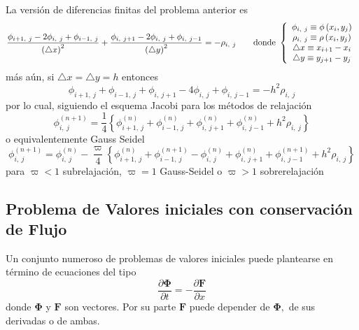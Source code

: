 \documentclass[spanish,titlepage,11pt]{article}
\begin{document}
La versi\'{o}n de diferencias finitas del problema anterior es
\[
\dfrac{\phi_{i+1,\ j}-2\phi_{i,\ j}+\phi_{i-1,\ j}}{\left(  \triangle
x\right)  ^{2}}+\dfrac{\phi_{i,\ j+1}-2\phi_{i,\ j}+\phi_{i,\ j-1}}{\left(
\triangle y\right)  ^{2}}=-\rho_{i,\ j}\qquad\mathrm{donde\ }\left\{
\begin{array}
[c]{c}%
\phi_{i,\ j}\equiv\phi\left(  x_{i},y_{j}\right)  \\
\rho_{i,\ j}\equiv\rho\left(  x_{i},y_{j}\right)  \\
\triangle x\equiv x_{i+1}-x_{i}\\
\triangle y\equiv y_{j+1}-y_{j}%
\end{array}
\right.
\]
m\'{a}s a\'{u}n, si $\triangle x=\triangle y=h$ entonces
\[
\phi_{i+1,\ j}+\phi_{i-1,\ j}+\phi_{i,\ j+1}-4\phi_{i,\ j}+\phi_{i,\ j-1}%
=-h^{2}\rho_{i,\ j}%
\]
por lo cual, siguiendo el esquema Jacobi para los m\'{e}todos de
relajaci\'{o}n
\[
\phi_{i,\ j}^{(n+1)}=\dfrac{1}{4}\left\{  \phi_{i+1,\ j}^{\left(  n\right)
}+\phi_{i-1,\ j}^{\left(  n\right)  }+\phi_{i,\ j+1}^{\left(  n\right)  }%
+\phi_{i,\ j-1}^{\left(  n\right)  }+h^{2}\rho_{i,\ j}\right\}
\]
o equivalentemente Gauss Seidel
\[
\phi_{i,\ j}^{(n+1)}=\phi_{i,\ j}^{(n)}-\dfrac{\varpi}{4}\left\{
\phi_{i+1,\ j}^{\left(  n\right)  }+\phi_{i-1,\ j}^{\left(  n+1\right)  }%
-\phi_{i,\ j}^{(n)}+\phi_{i,\ j+1}^{\left(  n\right)  }+\phi_{i,\ j-1}%
^{\left(  n+1\right)  }+h^{2}\rho_{i,\ j}\right\}
\]
para $\varpi<1$ subrelajaci\'{o}n, $\varpi=1$ Gauss-Seidel o $\varpi>1$ sobrerelajaci\'{o}n

\subsection{Problema de Valores iniciales con conservaci\'{o}n de Flujo}

Un conjunto numeroso de problemas de valores iniciales puede plantearse en
t\'{e}rmino de ecuaciones del tipo
\[
\dfrac{\partial\mathbf{\Phi}}{\partial t}=-\dfrac{\partial\mathbf{F}}{\partial
x}
\]
donde $\mathbf{\Phi}$ y $\mathbf{F}$ son vectores. Por su parte $\mathbf{F}$
puede depender de $\mathbf{\Phi,}$ de sus derivadas o de ambas.
\end{document}
